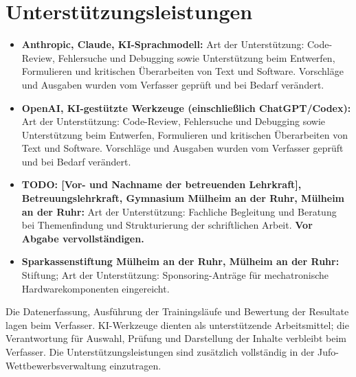 \section*{Unterstützungsleistungen}

\begin{itemize}
    \item \textbf{Anthropic, Claude, KI-Sprachmodell:} Art der Unterstützung: Code-Review, Fehlersuche und Debugging sowie Unterstützung beim Entwerfen, Formulieren und kritischen Überarbeiten von Text und Software. Vorschläge und Ausgaben wurden vom Verfasser geprüft und bei Bedarf verändert.
    \item \textbf{OpenAI, KI-gestützte Werkzeuge (einschließlich ChatGPT/Codex):} Art der Unterstützung: Code-Review, Fehlersuche und Debugging sowie Unterstützung beim Entwerfen, Formulieren und kritischen Überarbeiten von Text und Software. Vorschläge und Ausgaben wurden vom Verfasser geprüft und bei Bedarf verändert.
    \item \textbf{TODO: [Vor- und Nachname der betreuenden Lehrkraft], Betreuungslehrkraft, Gymnasium Mülheim an der Ruhr, Mülheim an der Ruhr:} Art der Unterstützung: Fachliche Begleitung und Beratung bei Themenfindung und Strukturierung der schriftlichen Arbeit. \textbf{Vor Abgabe vervollständigen.}
    \item \textbf{Sparkassenstiftung Mülheim an der Ruhr, Mülheim an der Ruhr:} Stiftung; Art der Unterstützung: Sponsoring-Anträge für mechatronische Hardwarekomponenten eingereicht.
\end{itemize}

Die Datenerfassung, Ausführung der Trainingsläufe und Bewertung der Resultate lagen beim Verfasser. KI-Werkzeuge dienten als unterstützende Arbeitsmittel; die Verantwortung für Auswahl, Prüfung und Darstellung der Inhalte verbleibt beim Verfasser. Die Unterstützungsleistungen sind zusätzlich vollständig in der Jufo-Wettbewerbsverwaltung einzutragen.
